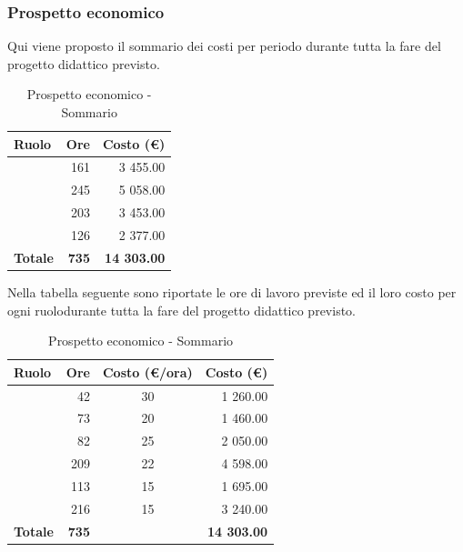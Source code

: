 \documentclass[12pt,a4paper]{article}
\begin{document}
\newpage
\subsubsection{Prospetto economico}
Qui viene proposto il sommario dei costi per periodo durante tutta la fare del progetto didattico previsto.

\begin{table}[H]
	\begin{center}
		\begin{tabular}{l r r}
			\toprule
			\textbf{Ruolo}	& \textbf{Ore} & \textbf{Costo (\euro)} \\ \midrule
			\midrule
			\FA{} & 161 & 3 455.00 \\ \midrule
			\FPA{} & 245 & 5 058.00 \\ \midrule
			\FPDC{} & 203 & 3 453.00 \\ \midrule
			\FVV{} & 126 & 2 377.00 \\ \midrule
			\textbf{Totale} & \textbf{735} & \textbf{14 303.00} \\
			\bottomrule
		\end{tabular}
		\caption{Prospetto economico - Sommario}
	\end{center}
\end{table}

Nella tabella seguente sono riportate le ore di lavoro previste ed il loro costo per ogni ruolodurante tutta la fare del progetto didattico previsto.

\begin{table}[H]
	\begin{center}
		\begin{tabular}{l r c r}
			\toprule
			\textbf{Ruolo}	& \textbf{Ore} & \textbf{Costo (\euro/ora)}	& \textbf{Costo (\euro)} \\ \midrule
			\midrule
			\RE{} & 42 & 30 & 1 260.00 \\ \midrule
			\AM{} & 73 & 20 & 1 460.00 \\ \midrule
			\AN{} & 82 & 25 & 2 050.00 \\ \midrule
			\PG{} & 209 & 22 & 4 598.00 \\ \midrule
			\PR{} & 113 & 15 & 1 695.00 \\ \midrule
			\VR{} & 216 & 15 & 3 240.00 \\ \midrule
			\textbf{Totale} & \textbf{735} &  & \textbf{14 303.00} \\
			\bottomrule
		\end{tabular}
		\caption{Prospetto economico - Sommario}
	\end{center}
\end{table}
\end{document}
